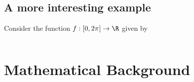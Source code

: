 \documentclass[12pt,notitlepage]{report}
\begin{document}
	\section{A more interesting example}

		Consider the function $f:[0,2\pi]\to\R$ given by

		\inputminted[linenos,bgcolor=LightGray]{python}{code/cos_plot.py}


\chapter{Mathematical Background}

	\lipsum[1]

	\begin{thm}
		\lipsum[2]
	\end{thm}

	\lipsum[3]


\end{document}

